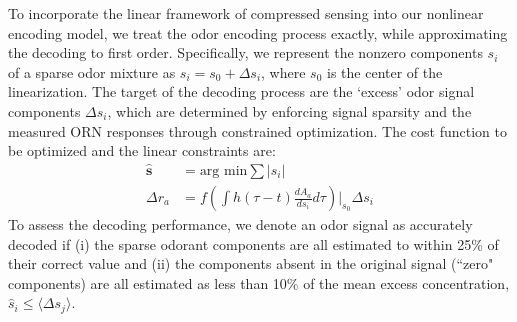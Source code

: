 \documentclass[9pt,twocolumn,twoside,lineno]{pnas-new}
\begin{document}
To incorporate the linear framework of compressed sensing into our nonlinear encoding model, we treat the odor encoding process exactly, while approximating the decoding to first order. Specifically, we represent the nonzero components $s_i$ of a  sparse odor mixture as $s_i = s_0 + \Delta s_i$, where $s_0$ is the center of the linearization. The target of the decoding process are the `excess' odor signal components $\Delta s_i$, which are determined by enforcing signal sparsity and the measured ORN responses through constrained optimization. The cost function to be optimized and the linear constraints are:
\begin{align}
\hat {\mathbf s} &= \text{arg min} \sum |s_i| \\
\Delta r_a &= {f}\left(\int h(\tau - t)\frac{dA_a}{ds_i}d \tau\right) \bigg |_{s_0} \Delta s_i
\end{align}
To assess the decoding performance, we denote an odor signal as accurately decoded if (i) the sparse odorant components are all estimated to within 25\% of their correct value and (ii) the components absent in the original signal (``zero" components) are all estimated as less than 10\% of the mean excess concentration, $\hat s_i \le \langle \Delta s_j \rangle$. 

\end{document}
